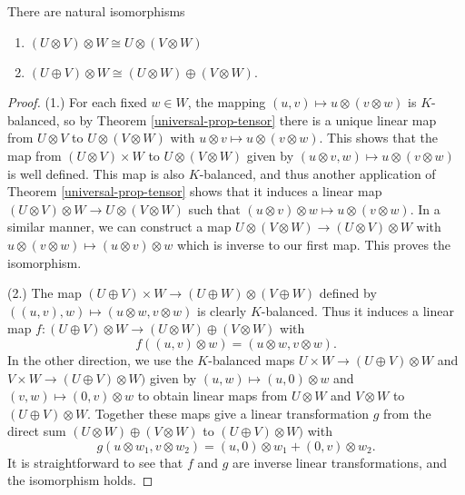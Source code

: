 \begin{prop}
There are natural isomorphisms 
\begin{enumerate}
\item $(U \otimes V) \otimes W \cong U \otimes (V \otimes W)$ 
\item $( U \oplus V) \otimes W \cong (U \otimes W) \oplus (V \otimes W)$.
\end{enumerate}
\end{prop}
\begin{proof}
(1.) For each fixed $w \in W$, the mapping $(u,v) \mapsto u \otimes ( v \otimes w)$ is $K$-balanced, so by Theorem \ref{universal-prop-tensor} there is a unique linear map from $U \otimes V$ to $U \otimes ( V \otimes W)$ with $u \otimes v \mapsto u \otimes (v \otimes w)$.  This shows that the map from $(U \otimes V ) \times W$ to $U \otimes ( V \otimes W)$ given by $(u \otimes v, w ) \mapsto u \otimes (v \otimes w)$ is well defined.  This map is also $K$-balanced, and  thus another application of Theorem \ref{universal-prop-tensor} shows that it induces a linear map $(U \otimes V) \otimes W \to U \otimes ( V \otimes W)$ such that $(u \otimes v) \otimes w \mapsto u \otimes (v \otimes w)$.  In a similar manner, we can construct a map $U \otimes (V \otimes W) \to (U \otimes V) \otimes W$ with $u \otimes ( v \otimes w) \mapsto (u \otimes v) \otimes w$ which is inverse to our first map.  This proves the isomorphism.

(2.)  The map $(U \oplus V ) \times W \to (U \oplus W) \otimes (V \oplus W)$ defined by $((u, v ) , w) \mapsto (u \otimes w, v \otimes w)$ is clearly $K$-balanced.  Thus it induces a linear map $f \colon (U \oplus V) \otimes W \to (U \otimes W) \oplus (V \otimes W)$ with 
\[ f ( ( u, v ) \otimes w) = (u \otimes w, v \otimes w). \]
In the other direction, we use the $K$-balanced maps $U \times W \to (U \oplus V) \otimes W$ and $V \times W \to (U \oplus V) \otimes W)$ given by $(u, w) \mapsto (u, 0)\otimes w$ and $(v,w) \mapsto (0,v) \otimes w$ to obtain linear maps from $U \otimes W$ and $V \otimes W$ to $(U \oplus V) \otimes W$.  Together these maps give a linear transformation $g$ from the direct sum $(U \otimes W) \oplus ( V \otimes W)$ to $(U \oplus V) \otimes W)$ with 
\[ g ( u \otimes w_1, v \otimes w_2) = (u, 0) \otimes w_1 + (0,v) \otimes w_2. \]
It is straightforward to see that $f$ and $g$ are inverse linear transformations, and the isomorphism holds.
\end{proof}


